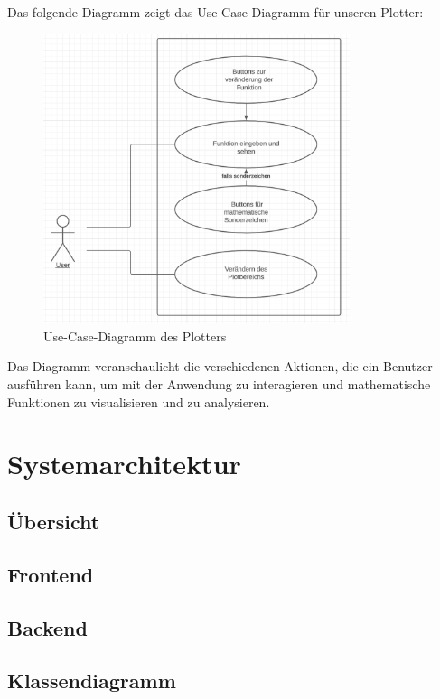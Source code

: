 \documentclass[a4paper]{article}
\begin{document}
Das folgende Diagramm zeigt das Use-Case-Diagramm für unseren Plotter:

\begin{figure}[h]
\centering
\includegraphics[width=0.8\textwidth]{Resources/use-case-diagram.png}
\caption{Use-Case-Diagramm des Plotters}
\label{fig:use_case_diagram}
\end{figure}

Das Diagramm veranschaulicht die verschiedenen Aktionen, die ein Benutzer ausführen kann, um mit der Anwendung zu interagieren und mathematische Funktionen zu visualisieren und zu analysieren.

\section{Systemarchitektur}

\subsection{Übersicht}

\subsection{Frontend}

\subsection{Backend}

\subsection{Klassendiagramm}
\end{document}
